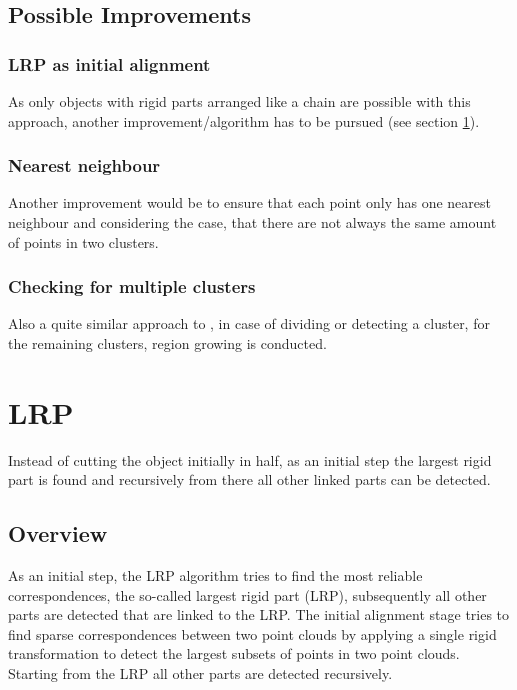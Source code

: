 \documentclass[notitlepage,english]{report}
\begin{document}
\subsection{Possible Improvements}

\subsubsection{LRP as initial alignment}

As only objects with rigid parts arranged like a chain are possible with this approach, another improvement/algorithm has to be pursued (see section \ref{sec:LRP}).

\subsubsection{Nearest neighbour}

Another improvement would be to ensure that each point only has one nearest neighbour and considering the case, that there are not always the same amount of points in two clusters. 

\subsubsection{Checking for multiple clusters}

Also a quite similar approach to \cite{guo2016correspondence}, in case of dividing or detecting a cluster, for the remaining clusters, region growing is conducted. 

\section{LRP}
\label{sec:LRP}

Instead of cutting the object initially in half, as an initial step the largest rigid part is found and recursively from there all other linked parts can be detected.

\subsection{Overview}
As an initial step, the LRP algorithm tries to find the most reliable correspondences, the so-called largest rigid part (LRP), subsequently all other parts are detected that are linked to the LRP. The initial alignment stage tries to find sparse correspondences between two point clouds by applying a single rigid transformation to detect the largest subsets of points in two point clouds. Starting from the LRP all other parts are detected recursively.
\end{document}
